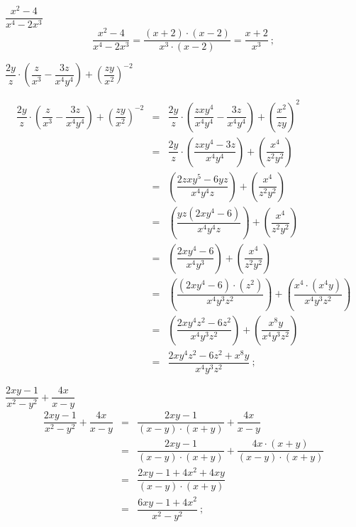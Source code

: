  \begin{exem}
 $\dfrac{x^2 - 4}{x^4 - 2x^3}$
\begin{equation}
\dfrac{x^2 - 4}{x^4 - 2x^3}= \dfrac{(x+2) \cdot (x-2)}{x^3 \cdot (x - 2)}= \dfrac{x+2}{x^3} \ ; 
\end{equation}
  \end{exem}
 
 \begin{exem}
  $\dfrac{2y}{z} \cdot \left( \dfrac{z}{x^3} - \dfrac{3z}{x^4y^4} \right) + \left( \dfrac{zy}{x^2} \right)^{-2}$
  
  \begin{eqnarray*}
   \dfrac{2y}{z} \cdot \left( \dfrac{z}{x^3} - \dfrac{3z}{x^4y^4} \right) + \left( \dfrac{zy}{x^2} \right)^{-2} 
   &=& \dfrac{2y}{z} \cdot \left( \dfrac{zxy^4}{x^4y^4} - \dfrac{3z}{x^4y^4} \right) + \left( \dfrac{x^2}{zy} \right)^{2} \\
   &=& \dfrac{2y}{z} \cdot \left( \dfrac{zxy^4 - 3z}{x^4y^4} \right) + \left( \dfrac{x^4}{z^2y^2} \right) \\
   &=& \left( \dfrac{2zxy^5 - 6yz}{x^4y^4z} \right) + \left( \dfrac{x^4}{z^2y^2} \right) \\
   &=& \left( \dfrac{yz(2xy^4 - 6)}{x^4y^4z} \right) + \left( \dfrac{x^4}{z^2y^2} \right) \\
   &=& \left( \dfrac{2xy^4 - 6}{x^4y^3} \right) + \left( \dfrac{x^4}{z^2y^2} \right) \\
   &=& \left( \dfrac{(2xy^4 - 6) \cdot (z^2)}{x^4y^3z^2} \right) + \left( \dfrac{x^4 \cdot (x^4y)}{x^4y^3z^2} \right) \\
   &=& \left( \dfrac{2xy^4z^2 - 6z^2}{x^4y^3z^2} \right) + \left( \dfrac{x^8y}{x^4y^3z^2} \right) \\
   &=& \dfrac{2xy^4z^2 - 6z^2 + x^8y}{x^4y^3z^2} \ ;
  \end{eqnarray*}
 \end{exem}
 
 \begin{exem}
  $\dfrac{2xy-1}{x^2 - y^2} + \dfrac{4x}{x-y}$
  \begin{eqnarray*}
   \dfrac{2xy-1}{x^2 - y^2} + \dfrac{4x}{x-y} &=& \dfrac{2xy-1}{(x-y)\cdot (x+y)} + \dfrac{4x}{x-y} \\
   &=& \dfrac{2xy-1}{(x-y)\cdot (x+y)} + \dfrac{4x \cdot (x+y)}{(x-y)\cdot (x+y)} \\
   &=& \dfrac{2xy - 1 + 4x^2 + 4xy}{(x-y)\cdot (x+y)} \\
   &=& \dfrac{6xy - 1 + 4x^2}{x^2 - y^2} \ ;
  \end{eqnarray*}
  \end{exem}
 

